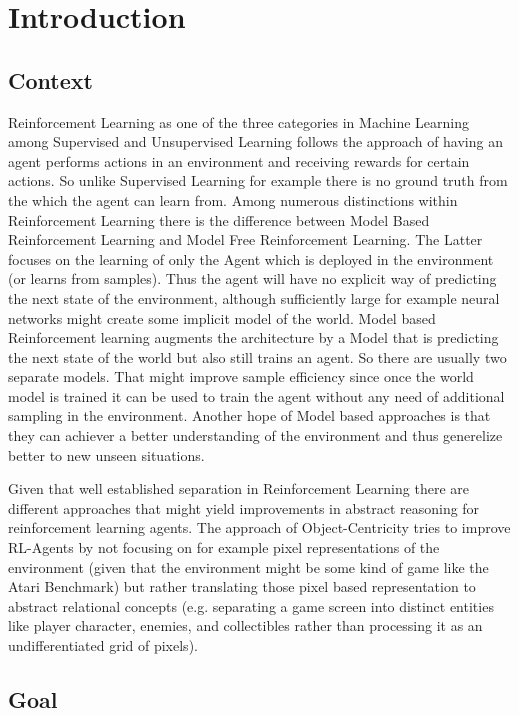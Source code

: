 \documentclass[
	english,
	ruledheaders=section,
	class=report,
	thesis={type=master},
	accentcolor=9c,
	custommargins=true,
	marginpar=false,
	parskip=half-,
	fontsize=11pt,
]{tudapub}
\begin{document}
\chapter{Introduction}
\label{chap:introduction}

\section{Context}
\label{sec:context}

Reinforcement Learning as one of the three categories in Machine Learning among Supervised and Unsupervised Learning follows the approach of having an agent performs actions in an environment and receiving rewards for certain actions. So unlike Supervised Learning for example there is no ground truth from the which the agent can learn from. Among numerous distinctions within Reinforcement Learning there is the difference between Model Based Reinforcement Learning and Model Free Reinforcement Learning. The Latter focuses on the learning of only the Agent which is deployed in the environment (or learns from samples). Thus the agent will have no explicit way of predicting the next state of the environment, although sufficiently large for example neural networks might create some implicit model of the world. Model based Reinforcement learning augments the architecture by a Model that is predicting the next state of the world but also still trains an agent. So there are usually two separate models. That might improve sample efficiency since once the world model is trained it can be used to train the agent without any need of additional sampling in the environment. Another hope of Model based approaches is that they can achiever a better understanding of the environment and thus generelize better to new unseen situations.

Given that well established separation in Reinforcement Learning there are different approaches that might yield improvements in abstract reasoning for reinforcement learning agents. The approach of Object-Centricity tries to improve RL-Agents by not focusing on for example pixel representations of the environment (given that the environment might be some kind of game like the Atari Benchmark) but rather translating those pixel based representation to abstract relational concepts (e.g. separating a game screen into distinct entities like player character, enemies, and collectibles rather than processing it as an undifferentiated grid of pixels).

\section{Goal}
\label{sec:goal}
\end{document}
